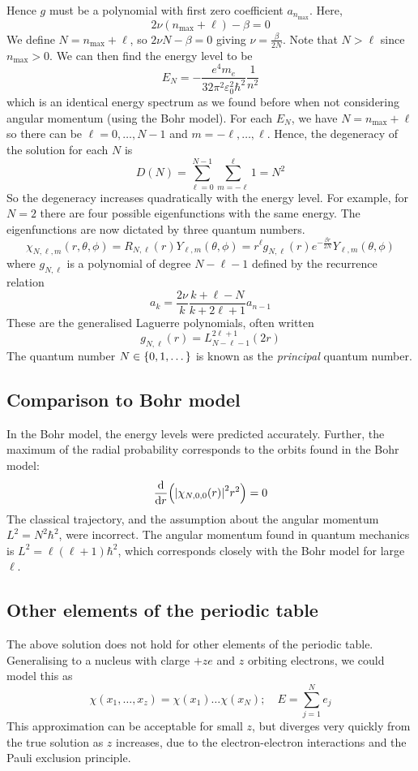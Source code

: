 \documentclass[a4paper,11pt]{article}
\begin{document}
Hence \( g \) must be a polynomial with first zero coefficient \( a_{n_{\max}} \).
Here,
\[
	2\nu(n_{\max} + \ell) - \beta = 0
\]
We define \( N = n_{\max} + \ell \), so \( 2 \nu N - \beta = 0 \) giving \( \nu = \frac{\beta}{2N} \).
Note that \( N > \ell \) since \( n_{\max} > 0 \).
We can then find the energy level to be
\[
	E_N = -\frac{e^4 m_e}{32 \pi^2 \varepsilon_0^2 \hbar^2} \frac{1}{n^2}
\]
which is an identical energy spectrum as we found before when not considering angular momentum (using the Bohr model).
For each \( E_N \), we have \( N = n_{\max} + \ell \) so there can be \( \ell = 0, \dots, N-1 \) and \( m = -\ell, \dots, \ell \).
Hence, the degeneracy of the solution for each \( N \) is
\[
	D(N) = \sum_{\ell=0}^{N-1} \sum_{m=-\ell}^\ell 1 = N^2
\]
So the degeneracy increases quadratically with the energy level.
For example, for \( N = 2 \) there are four possible eigenfunctions with the same energy.
The eigenfunctions are now dictated by three quantum numbers.
\[
	\chi_{N,\ell,m}(r,\theta,\phi) = R_{N,\ell}(r)Y_{\ell,m}(\theta,\phi) = r^\ell g_{N,\ell}(r) e^{-\frac{\beta r}{2N}} Y_{\ell,m}(\theta,\phi)
\]
where \( g_{N,\ell} \) is a polynomial of degree \( N - \ell - 1 \) defined by the recurrence relation
\[
	a_k = \frac{2\nu}{k} \frac{k + \ell - N}{k + 2\ell + 1} a_{n-1}
\]
These are the generalised Laguerre polynomials, often written
\[
	g_{N,\ell}(r) = L_{N - \ell - 1}^{2\ell + 1}(2r)
\]
The quantum number \( N \in \qty{0, 1, \dots} \) is known as the \textit{principal} quantum number.

\subsection{Comparison to Bohr model}
In the Bohr model, the energy levels were predicted accurately.
Further, the maximum of the radial probability corresponds to the orbits found in the Bohr model:
\[
	\dv{r} \qty( \abs{\chi_{N,0,0}(r)}^2 r^2) = 0
\]
The classical trajectory, and the assumption about the angular momentum \( L^2 = N^2 \hbar^2 \), were incorrect.
The angular momentum found in quantum mechanics is \( L^2 = \ell(\ell+1) \hbar^2 \), which corresponds closely with the Bohr model for large \( \ell \).

\subsection{Other elements of the periodic table}
The above solution does not hold for other elements of the periodic table.
Generalising to a nucleus with clarge \( +ze \) and \( z \) orbiting electrons, we could model this as
\[
	\chi(x_1, \dots, x_z) = \chi(x_1) \dots \chi(x_N);\quad E = \sum_{j=1}^N e_j
\]
This approximation can be acceptable for small \( z \), but diverges very quickly from the true solution as \( z \) increases, due to the electron-electron interactions and the Pauli exclusion principle.
\end{document}
